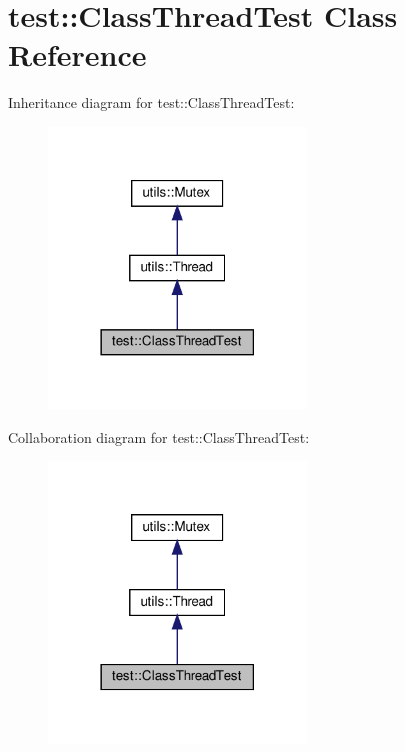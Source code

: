 \hypertarget{classtest_1_1ClassThreadTest}{}\section{test\+:\+:Class\+Thread\+Test Class Reference}
\label{classtest_1_1ClassThreadTest}


Inheritance diagram for test\+:\+:Class\+Thread\+Test\+:
\nopagebreak
\begin{figure}[H]
\begin{center}
\leavevmode
\includegraphics[width=194pt]{classtest_1_1ClassThreadTest__inherit__graph}
\end{center}
\end{figure}


Collaboration diagram for test\+:\+:Class\+Thread\+Test\+:
\nopagebreak
\begin{figure}[H]
\begin{center}
\leavevmode
\includegraphics[width=194pt]{classtest_1_1ClassThreadTest__coll__graph}
\end{center}
\end{figure}
